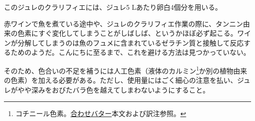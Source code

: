 \begin{recette}

このジュレのクラリフィエには、ジュレ5 Lあたり卵白4個分を用いる。

赤ワインで魚を煮ている途中や、ジュレのクラリフィエ作業の際に、タンニン由来の色素にすぐ変化してしまうことがしばしば、というかほぼ必ず起こる。ワインが分解してしまうのは魚のフュメに含まれているゼラチン質と接触して反応するためのようだ。こんにちに至るまで、これを避ける方法は見つかっていない。

そのため、色合いの不足を補うには人工色素（液体のカルミン\footnote{コチニール色素。\protect\hyperlink{beurres-composes}{合わせバター}本文および訳注参照。}か別の植物由来の色素）を加える必要がある。ただし、使用量にはごく細心の注意を払い、ジュレがやや深みをおびたバラ色を越えてしまわないようにすること。

\end{recette}
